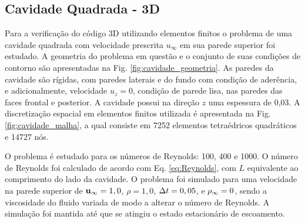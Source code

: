 \documentclass[tese_patricia]{subfiles}%
\begin{document}
\subsection{Cavidade Quadrada - 3D} \label{subsec:CavQua3d}

Para a verificação do código 3D utilizando elementos finitos o problema de uma cavidade quadrada com velocidade prescrita $u_{\infty}$ em sua parede superior foi estudado. A geometria do problema em questão e o conjunto de suas condições de contorno são apresentadas na Fig. \ref{fig:cavidade_geometria}. As paredes da cavidade são rígidas, com paredes laterais e do fundo com condição de aderência, e adicionalmente, velocidade $u_{z}=0$, condição de parede lisa, nas paredes das faces frontal e posterior. A cavidade possui na direção $z$ uma espessura de 0,03. A discretização espacial em elementos finitos utilizada é apresentada na Fig.  \ref{fig:cavidade_malha}, a qual consiste em 7252 elementos tetraédricos quadráticos e 14727 nós.

O problema é estudado para os números de Reynolds: 100, 400 e 1000. O número de Reynolds foi calculado de acordo com Eq. \eqref{eq:Reynolds}, com $L$ equivalente ao comprimento do lado da cavidade. O problema foi simulado para uma velocidade na parede superior de $\mathbf{u}_{\infty} = 1,0$, $\rho = 1,0$, $\Delta t = 0,05$, e $\rho_\infty = 0$, sendo a viscosidade do fluido variada de modo a alterar o número de Reynolds. A simulação foi mantida até que se atingiu o estado estacionário de escoamento. 
\end{document}
